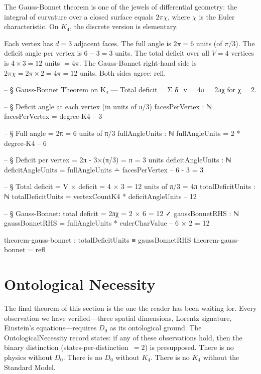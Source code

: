 \documentclass[11pt,a4paper]{book}
\def\texttt#1{#1}%
\begin{document}
The Gauss-Bonnet theorem is one of the jewels of differential geometry: the integral of curvature over a closed surface equals $2\pi\chi$, where $\chi$ is the Euler characteristic. On $K_4$, the discrete version is elementary.

Each vertex has $d = 3$ adjacent faces. The full angle is $2\pi = 6$ units (of $\pi/3$). The deficit angle per vertex is $6 - 3 = 3$ units. The total deficit over all $V = 4$ vertices is $4 \times 3 = 12$ units $= 4\pi$. The Gauss-Bonnet right-hand side is $2\pi\chi = 2\pi \times 2 = 4\pi = 12$ units. Both sides agree: \texttt{refl}.

\begin{code}
-- § Gauss-Bonnet Theorem on K₄ — Total deficit = Σ δ_v = 4π = 2πχ for χ = 2.

-- § Deficit angle at each vertex (in units of π/3)
facesPerVertex : ℕ
facesPerVertex = degree-K4  -- 3

-- § Full angle = 2π = 6 units of π/3
fullAngleUnits : ℕ
fullAngleUnits = 2 * degree-K4  -- 6

-- § Deficit per vertex = 2π - 3×(π/3) = π = 3 units
deficitAngleUnits : ℕ
deficitAngleUnits = fullAngleUnits ∸ facesPerVertex  -- 6 - 3 = 3

-- § Total deficit = V × deficit = 4 × 3 = 12 units of π/3 = 4π
totalDeficitUnits : ℕ
totalDeficitUnits = vertexCountK4 * deficitAngleUnits  -- 12

-- § Gauss-Bonnet: total deficit = 2πχ = 2 × 6 = 12 ✓
gaussBonnetRHS : ℕ
gaussBonnetRHS = fullAngleUnits * eulerCharValue  -- 6 × 2 = 12

theorem-gauss-bonnet : totalDeficitUnits ≡ gaussBonnetRHS
theorem-gauss-bonnet = refl
\end{code}

\section{Ontological Necessity}
\label{sec:ontological-necessity}

The final theorem of this section is the one the reader has been waiting for. Every observation we have verified---three spatial dimensions, Lorentz signature, Einstein's equations---requires $D_0$ as its ontological ground. The \texttt{OntologicalNecessity} record states: if any of these observations hold, then the binary distinction (\texttt{states-per-distinction}~$= 2$) is presupposed. There is no physics without $D_0$. There is no $D_0$ without $K_4$. There is no $K_4$ without the Standard Model.
\end{document}
